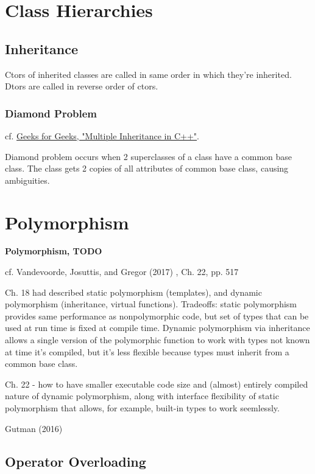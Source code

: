 \documentclass[10pt]{amsart}
\begin{document}
\begin{multicols*}{2}
\section{Class Hierarchies}

\subsection{Inheritance}

Ctors of inherited classes are called in same order in which they're inherited. Dtors are called in reverse order of ctors.

\subsubsection{Diamond Problem}

cf. \href{https://www.geeksforgeeks.org/multiple-inheritance-in-c/}{Geeks for Geeks, "Multiple Inheritance in C++"}.

Diamond problem occurs when 2 superclasses of a class have a common base class. The class gets 2 copies of all attributes of common base class, causing ambiguities.

\section{Polymorphism}

\textbf{Polymorphism, TODO}

cf. Vandevoorde, Josuttis, and Gregor (2017) \cite{VJG2017}, Ch. 22, pp. 517

Ch. 18 had described static polymorphism (templates), and dynamic polymorphism (inheritance, virtual functions). Tradeoffs: static polymorphism provides same performance as nonpolymorphic code, but set of types that can be used at run time is fixed at compile time. Dynamic polymorphism via inheritance allows a single version of the polymorphic function to work with types not known at time it's compiled, but it's less flexible because types must inherit from a common base class.

Ch. 22 - how to have smaller executable code size and (almost) entirely compiled nature of dynamic polymorphism, along with interface flexibility of static polymorphism that allows, for example, built-in types to work seemlessly.

Gutman (2016) \cite{Gutt2016}

\subsection{Operator Overloading}


\end{multicols*}
\end{document}
